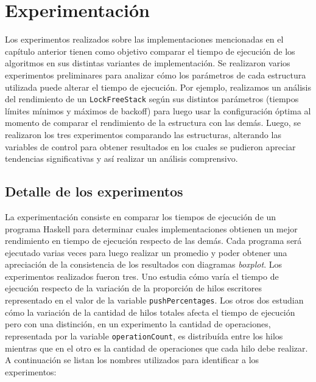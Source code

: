 \chapter{Experimentación}\label{chap:experiments}
Los experimentos realizados sobre las implementaciones mencionadas en el capítulo anterior tienen como objetivo comparar el tiempo de ejecución de los algoritmos en sus distintas variantes de implementación.
Se realizaron varios experimentos preliminares para analizar cómo los parámetros de cada estructura utilizada puede alterar el tiempo de ejecución.
Por ejemplo, realizamos un análisis del rendimiento de un \texttt{LockFreeStack} según sus distintos parámetros (tiempos límites mínimos y máximos de backoff) para luego usar la configuración óptima al momento de comparar el rendimiento de la estructura con las demás.
Luego, se realizaron los tres experimentos comparando las estructuras, alterando las variables de control para obtener resultados en los cuales se pudieron apreciar tendencias significativas y así realizar un análisis comprensivo.

\section{Detalle de los experimentos}\label{sec:experiment-details}

La experimentación consiste en comparar los tiempos de ejecución de un programa Haskell para determinar cuales implementaciones obtienen un mejor rendimiento en tiempo de ejecución respecto de las demás.
Cada programa será ejecutado varias veces para luego realizar un promedio y poder obtener una apreciación de la consistencia de los resultados con diagramas \emph{boxplot}.
Los experimentos realizados fueron tres.
Uno estudia cómo varía el tiempo de ejecución respecto de la variación de la proporción de hilos escritores representado en el valor de la variable \texttt{pushPercentages}.
Los otros dos estudian cómo la variación de la cantidad de hilos totales afecta el tiempo de ejecución pero con una distinción, en un experimento la cantidad de operaciones, representada por la variable \texttt{operationCount}, es distribuída entre los hilos mientras que en el otro es la cantidad de operaciones que cada hilo debe realizar.
A continuación se listan los nombres utilizados para identificar a los experimentos:

